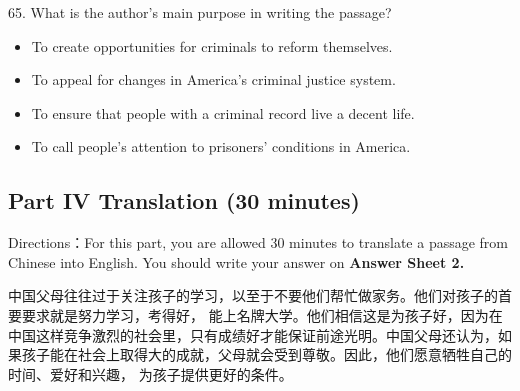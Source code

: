 \documentclass[UTF8,11pt]{ctexart}
\begin{document}
65. What is the author’s main purpose in writing the passage?


\begin{itemize}[leftmargin=2em,itemsep=.2em,topsep=.4em]\item[A.] To create opportunities for criminals to reform themselves.
\item[B.] To appeal for changes in America’s criminal justice system.
\item[C.] To ensure that people with a criminal record live a decent life.
\item[D.] To call people’s attention to prisoners’ conditions in America.
\end{itemize}

\subsection*{Part IV Translation (30 minutes)}


Directions：For this part, you are allowed 30 minutes to translate a passage from Chinese into English. You should write your answer on\textbf{ Answer Sheet 2.}


中国父母往往过于关注孩子的学习，以至于不要他们帮忙做家务。他们对孩子的首要要求就是努力学习，考得好， 能上名牌大学。他们相信这是为孩子好，因为在中国这样竞争激烈的社会里，只有成绩好才能保证前途光明。中国父母还认为，如果孩子能在社会上取得大的成就，父母就会受到尊敬。因此，他们愿意牺牲自己的时间、爱好和兴趣， 为孩子提供更好的条件。
\end{document}
